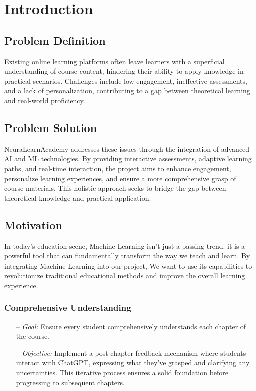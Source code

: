 
\chapter{Introduction}

\section{Problem Definition}
Existing online learning platforms often leave learners 
with a superficial understanding of course content, hindering 
their ability to apply knowledge in practical scenarios. 
Challenges include low engagement, ineffective assessments, 
and a lack of personalization, contributing to a gap between 
theoretical learning and real-world proficiency.

\section{Problem Solution}
NeuraLearnAcademy addresses these issues through the 
integration of advanced AI and ML technologies. By providing interactive 
assessments, adaptive learning paths, and real-time interaction, the project aims to enhance engagement, personalize learning experiences, and ensure a more comprehensive grasp of course materials.
This holistic approach seeks to bridge the gap between theoretical 
knowledge and practical application.

\section{Motivation}
In today's education scene, Machine Learning isn't just a passing trend.
it is a powerful tool that can fundamentally transform the way we teach and
learn. By integrating Machine Learning into our project, We want to
use its capabilities to revolutionize traditional educational methods
and improve the overall learning experience.

	\newpage

	\subsection{Comprehensive Understanding}
	\begin{itemize}
		\item[--] \textit{Goal:} Ensure every student comprehensively understands each chapter of the course.
		\item[--] \textit{Objective:} Implement a post-chapter feedback mechanism where students interact with ChatGPT, expressing what they've grasped and clarifying any uncertainties. This iterative process ensures a solid foundation before progressing to subsequent chapters.
	\end{itemize}

